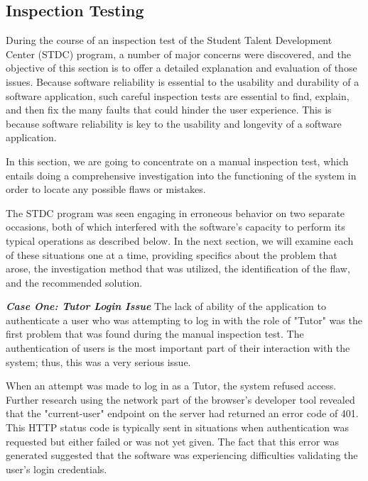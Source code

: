 \subsection{Inspection Testing}
\begin{justify}
    During the course of an inspection test of the Student Talent Development Center (STDC) program, a number of major concerns were discovered, and the objective of this section is to offer a detailed explanation and evaluation of those issues. Because software reliability is essential to the usability and durability of a software application, such careful inspection tests are essential to find, explain, and then fix the many faults that could hinder the user experience. This is because software reliability is key to the usability and longevity of a software application.

    \vspace{0.25cm}
    \newendline In this section, we are going to concentrate on a manual inspection test, which entails doing a comprehensive investigation into the functioning of the system in order to locate any possible flaws or mistakes.

    \vspace{0.25cm}
    \newendline The STDC program was seen engaging in erroneous behavior on two separate occasions, both of which interfered with the software's capacity to perform its typical operations as described below. In the next section, we will examine each of these situations one at a time, providing specifics about the problem that arose, the investigation method that was utilized, the identification of the flaw, and the recommended solution.
    

    \vspace{0.25cm}
    \newendline \textbf{\textit{Case One: Tutor Login Issue}}\newendline
    The lack of ability of the application to authenticate a user who was attempting to log in with the role of "Tutor" was the first problem that was found during the manual inspection test. The authentication of users is the most important part of their interaction with the system; thus, this was a very serious issue.

    \vspace{0.25cm}
    \newendline When an attempt was made to log in as a Tutor, the system refused access. Further research using the network part of the browser's developer tool revealed that the "current-user" endpoint on the server had returned an error code of 401. This HTTP status code is typically sent in situations when authentication was requested but either failed or was not yet given. The fact that this error was generated suggested that the software was experiencing difficulties validating the user's login credentials.


\end{justify}
